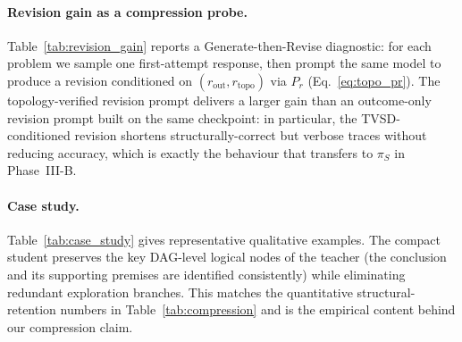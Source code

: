 

\paragraph{Revision gain as a compression probe.}
Table~\ref{tab:revision_gain} reports a Generate-then-Revise diagnostic:
for each problem we sample one first-attempt response, then prompt the
same model to produce a revision conditioned on
$(r_{\mathrm{out}},r_{\mathrm{topo}})$ via $P_r$ (Eq.~\ref{eq:topo_pr}).
The topology-verified revision prompt delivers a larger gain than an
outcome-only revision prompt built on the same checkpoint: in
particular, the TVSD-conditioned revision shortens structurally-correct
but verbose traces without reducing accuracy, which is exactly the
behaviour that transfers to $\pi_S$ in Phase~III-B.



\paragraph{Case study.}
Table~\ref{tab:case_study} gives representative qualitative examples.
The compact student preserves the key DAG-level logical nodes of the
teacher (the conclusion and its supporting premises are identified
consistently) while eliminating redundant exploration branches. This
matches the quantitative structural-retention numbers in
Table~\ref{tab:compression} and is the empirical content behind our
compression claim.
